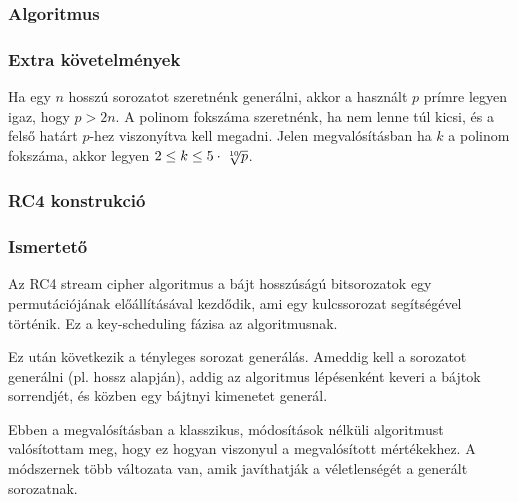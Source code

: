 \documentclass[12pt]{article}
\begin{document}
	\subsubsection*{Algoritmus}
	\subsubsection*{Extra követelmények}
	Ha egy $n$ hosszú sorozatot szeretnénk generálni, akkor a használt $p$ prímre legyen igaz, hogy $p > 2n$. A polinom fokszáma szeretnénk, ha nem lenne túl kicsi, és a felső határt $p$-hez viszonyítva kell megadni. Jelen megvalósításban ha $k$ a polinom fokszáma, akkor legyen $2 \leq k \leq 5\cdot\sqrt[\leftroot{-2}\uproot{2}10]{p}$.
	\subsubsection{RC4 konstrukció}
	\subsubsection*{Ismertető}
	Az RC4 stream cipher algoritmus a bájt hosszúságú bitsorozatok egy permutációjának előállításával kezdődik, ami egy kulcssorozat segítségével történik. Ez a key-scheduling fázisa az algoritmusnak.
	\par
	Ez után következik a tényleges sorozat generálás. Ameddig kell a sorozatot generálni (pl. hossz alapján), addig az algoritmus lépésenként keveri a bájtok sorrendjét, és közben egy bájtnyi kimenetet generál.
	\par
	Ebben a megvalósításban a klasszikus, módosítások nélküli algoritmust valósítottam meg, hogy ez hogyan viszonyul a megvalósított mértékekhez.
	A módszernek több változata van, amik javíthatják a véletlenségét a generált sorozatnak.
\end{document}
